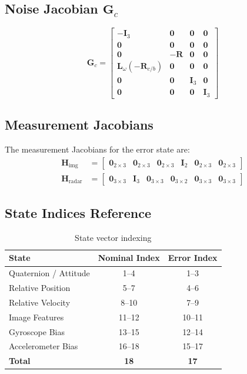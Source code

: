 \documentclass[11pt,a4paper]{article}
\newcommand{\R}{\mathbf{R}}
\newcommand{\I}{\mathbf{I}}
\begin{document}
\subsection{Noise Jacobian $\mathbf{G}_c$}
\begin{equation}
\mathbf{G}_c = \begin{bmatrix}
    -\I_3 & \mathbf{0} & \mathbf{0} & \mathbf{0} \\
    \mathbf{0} & \mathbf{0} & \mathbf{0} & \mathbf{0} \\
    \mathbf{0} & -\R & \mathbf{0} & \mathbf{0} \\
    \mathbf{L}_\omega(-\R_{c/b}) & \mathbf{0} & \mathbf{0} & \mathbf{0} \\
    \mathbf{0} & \mathbf{0} & \I_3 & \mathbf{0} \\
    \mathbf{0} & \mathbf{0} & \mathbf{0} & \I_3
\end{bmatrix}
\end{equation}

\subsection{Measurement Jacobians}
The measurement Jacobians for the error state are:
\begin{align}
    \mathbf{H}_{\text{img}} &= \begin{bmatrix} \mathbf{0}_{2\times 3} & \mathbf{0}_{2\times 3} & \mathbf{0}_{2\times 3} & \I_2 & \mathbf{0}_{2\times 3} & \mathbf{0}_{2\times 3} \end{bmatrix} \\[8pt]
    \mathbf{H}_{\text{radar}} &= \begin{bmatrix} \mathbf{0}_{3\times 3} & \I_3 & \mathbf{0}_{3\times 3} & \mathbf{0}_{3\times 2} & \mathbf{0}_{3\times 3} & \mathbf{0}_{3\times 3} \end{bmatrix}
\end{align}

\subsection{State Indices Reference}
\begin{table}[h]
\centering
\begin{tabular}{lcc}
\toprule
State & Nominal Index & Error Index \\
\midrule
Quaternion / Attitude & 1--4 & 1--3 \\
Relative Position & 5--7 & 4--6 \\
Relative Velocity & 8--10 & 7--9 \\
Image Features & 11--12 & 10--11 \\
Gyroscope Bias & 13--15 & 12--14 \\
Accelerometer Bias & 16--18 & 15--17 \\
\midrule
\textbf{Total} & \textbf{18} & \textbf{17} \\
\bottomrule
\end{tabular}
\caption{State vector indexing}
\end{table}
\end{document}
